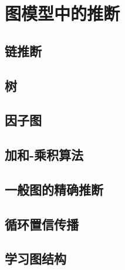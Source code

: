 \section{图模型中的推断}
\subsection*{链推断}
\subsection*{树}
\subsection*{因子图}
\subsection*{加和-乘积算法}
\subsection*{一般图的精确推断}
\subsection*{循环置信传播}
\subsection*{学习图结构}